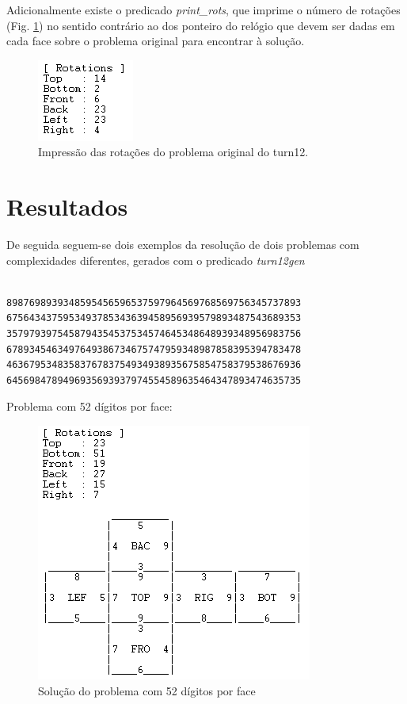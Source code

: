 Adicionalmente existe o predicado \textit{print\_rots}, que imprime o número de rotações (Fig. \ref{fig:3}) no sentido contrário ao dos ponteiro do relógio que devem ser dadas em cada face sobre o problema original para encontrar à solução.

\begin{figure}[H]
\begin{center}
\includegraphics[scale=0.6]{rots.png}
\caption{Impressão das rotações do problema original do turn12.}
\label{fig:3}
\end{center}
\end{figure}


\section{Resultados}
\label{rest:6}

De seguida seguem-se dois exemplos da resolução de dois problemas com complexidades diferentes, gerados com o predicado \textit{turn12gen}

\begin{f_exemplo}[H]
\begin{verbatim}

8987698939348595456596537597964569768569756345737893
6756434375953493785343639458956939579893487543689353
3579793975458794354537534574645348648939348956983756
6789345463497649386734675747959348987858395394783478
4636795348358376783754934938935675854758379538676936
6456984789496935693937974554589635464347893474635735
\end{verbatim}
\caption{Problema com 52 dígitos por face:}
\end{f_exemplo}

\begin{figure}[H]
\begin{center}
\includegraphics[scale=0.7]{ex1.png}
\caption{Solução do problema com 52 dígitos por face}
\label{fig:4}
\end{center}
\end{figure}

